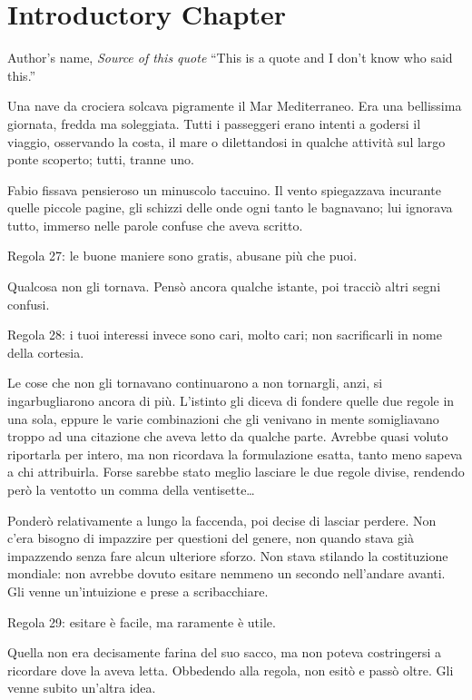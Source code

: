 \chapter{Introductory Chapter}

\begin{chapquote}{Author's name, \textit{Source of this quote}}
``This is a quote and I don't know who said this.''
\end{chapquote}


Una nave da crociera solcava pigramente il Mar Mediterraneo. Era una bellissima giornata, fredda ma soleggiata. Tutti i passeggeri erano intenti a godersi il viaggio, osservando la costa, il mare o dilettandosi in qualche attività sul largo ponte scoperto; tutti, tranne uno.

Fabio fissava pensieroso un minuscolo taccuino. Il vento spiegazzava incurante quelle piccole pagine, gli schizzi delle onde ogni tanto le bagnavano; lui ignorava tutto, immerso nelle parole confuse che aveva scritto.

Regola 27: le buone maniere sono gratis, abusane più che puoi.

Qualcosa non gli tornava. Pensò ancora qualche istante, poi tracciò altri segni confusi.

Regola 28: i tuoi interessi invece sono cari, molto cari; non sacrificarli in nome della cortesia.

Le cose che non gli tornavano continuarono a non tornargli, anzi, si ingarbugliarono ancora di più. L'istinto gli diceva di fondere quelle due regole in una sola, eppure le varie combinazioni che gli venivano in mente somigliavano troppo ad una citazione che aveva letto da qualche parte. Avrebbe quasi voluto riportarla per intero, ma non ricordava la formulazione esatta, tanto meno sapeva a chi attribuirla. Forse sarebbe stato meglio lasciare le due regole divise, rendendo però la ventotto un comma della ventisette\ldots

Ponderò relativamente a lungo la faccenda, poi decise di lasciar perdere. Non c'era bisogno di impazzire per questioni del genere, non quando stava già impazzendo senza fare alcun ulteriore sforzo. Non stava stilando la costituzione mondiale: non avrebbe dovuto esitare nemmeno un secondo nell'andare avanti. Gli venne un'intuizione e prese a scribacchiare.

Regola 29: esitare è facile, ma raramente è utile.

Quella non era decisamente farina del suo sacco, ma non poteva costringersi a ricordare dove la aveva letta. Obbedendo alla regola, non esitò e passò oltre. Gli venne subito un'altra idea.

